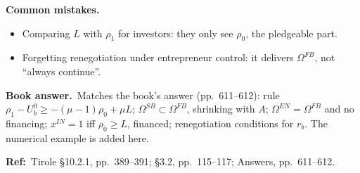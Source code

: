 \documentclass[11pt,a4paper]{article}
\newcommand{\bookans}{\par\medskip\noindent\textbf{Book answer.}~}
\newcommand{\refbib}{\par\smallskip\noindent\textbf{Ref:}~}
\newcommand{\pitfalls}{\par\medskip\noindent\textbf{Common mistakes.}}
\begin{document}
\pitfalls
\begin{itemize}
  \item Comparing $L$ with $\rho_1$ for investors: they only see $\rho_0$, the pledgeable part.
  \item Forgetting renegotiation under entrepreneur control: it delivers $\Omega^{FB}$, not ``always continue''.
\end{itemize}
\bookans Matches the book's answer (pp.~611--612): rule $\rho_1-U_b^0\ge-(\mu-1)\rho_0+\mu L$; $\Omega^{SB}\subset\Omega^{FB}$, shrinking with $A$; $\Omega^{EN}=\Omega^{FB}$ and no financing; $x^{IN}=1$ iff $\rho_0\ge L$, financed; renegotiation conditions for $r_b$. The numerical example is added here.
\refbib{Tirole \S10.2.1, pp.~389--391; \S3.2, pp.~115--117; Answers, pp.~611--612.}
\end{document}
